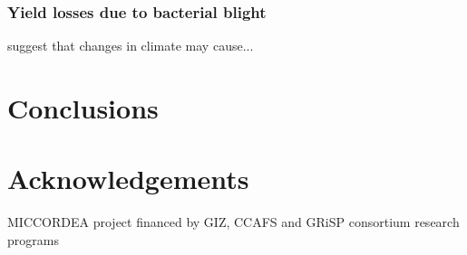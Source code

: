 \documentclass[preprint,12pt]{elsarticle}
\begin{document}
\subsubsection{Yield losses due to bacterial blight}


\citet{Burke2009} suggest that changes in climate may cause...

\section{Conclusions}

\section{Acknowledgements}
MICCORDEA project financed by GIZ, CCAFS and GRiSP consortium research programs















\end{document}
